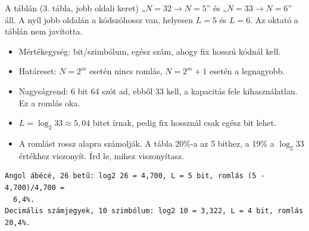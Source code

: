 \begin{center}\end{center}
\begin{figyelem}[Javítás]
A táblán (3. tábla, jobb oldali keret) „$N=32\to N=5$” és „$N=33\to N=6$” áll. A nyíl jobb oldalán a kódszóhossz van, helyesen $L=5$ és $L=6$. Az oktató a táblán nem javította.
\end{figyelem}
\begin{eredmeny}

\begin{center}\end{center}
\end{eredmeny}
\begin{tipp}[Ellenőrzés]
\begin{itemize}
\item Mértékegység: bit/szimbólum, egész szám, ahogy fix hosszú kódnál kell.
\item Határeset: $N=2^m$ esetén nincs romlás, $N=2^m+1$ esetén a legnagyobb.
\item Nagyságrend: 6 bit 64 szót ad, ebből 33 kell, a kapacitás fele kihasználatlan. Ez a romlás oka.
\end{itemize}
\end{tipp}
\begin{figyelem}
\begin{itemize}
\item $L=\log_2 33\approx 5{,}04$ bitet írnak, pedig fix hossznál csak egész bit lehet.
\item A romlást rossz alapra számolják. A tábla 20\%-a az 5 bithez, a 19\% a $\log_2 33$ értékhez viszonyít. Írd le, mihez viszonyítasz.
\end{itemize}
\end{figyelem}
\begin{tipp}
\small
\begin{verbatim}
Angol ábécé, 26 betű: log2 26 = 4,700, L = 5 bit, romlás (5 - 4,700)/4,700 =
  6,4%.
Decimális számjegyek, 10 szimbólum: log2 10 = 3,322, L = 4 bit, romlás 20,4%.
\end{verbatim}
\end{tipp}
\begin{tipp}

\par{}\par
\end{tipp}


